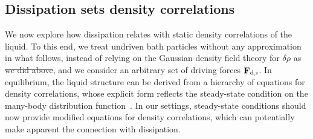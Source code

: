 \documentclass[superscriptaddress, twocolumn, prx, longbibliography, nofootinbib]{revtex4-1}
\providecommand{\DIFaddtex}[1]{{\protect\color{blue}\uwave{#1}}} %
\providecommand{\DIFdeltex}[1]{{\protect\color{red}\sout{#1}}}                      %
\providecommand{\DIFaddbegin}{} %
\providecommand{\DIFaddend}{} %
\providecommand{\DIFdelbegin}{} %
\providecommand{\DIFdelend}{} %
\providecommand{\DIFadd}[1]{\texorpdfstring{\DIFaddtex{#1}}{#1}} %
\providecommand{\DIFdel}[1]{\texorpdfstring{\DIFdeltex{#1}}{}} %
\begin{document}


\subsection{Dissipation sets density correlations}\label{sec:struc}

We now explore how dissipation relates with static density correlations of the liquid. To this end, we treat undriven bath particles without any approximation in what follows, instead of relying on the Gaussian density field theory for $\delta\rho$ as \DIFdelbegin \DIFdel{we did above}\DIFdelend \DIFaddbegin \DIFadd{in Sec.~\ref{sec:diff}}\DIFaddend , and we consider an arbitrary set of driving forces ${\bf F}_{{\rm d},i}$. In equilibrium, the liquid structure can be derived from a hierarchy of equations for density correlations, whose explicit form reflects the steady-state condition on the many-body distribution function~\cite{Hansen2013}. In our settings, steady-state conditions should now provide modified equations for density correlations, which can potentially make apparent the connection with dissipation.
\end{document}
